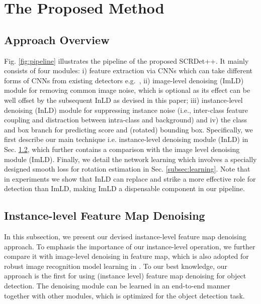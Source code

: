 \documentclass[10pt,journal,compsoc]{IEEEtran}
\begin{document}
\section{The Proposed Method}\label{sec:method}
\subsection{Approach Overview}
Fig. \ref{fig:pipeline} illustrates the pipeline of the proposed SCRDet++. It mainly consists of four modules: i) feature extraction via CNNs which can take different forms of CNNs from existing detectors e.g.~\cite{girshick2014rich,liu2016ssd}, ii) image-level denoising (ImLD) module for removing common image noise, which is optional as its effect can be well offset by the subsequent InLD as devised in this paper; iii) instance-level denoising (InLD) module for suppressing instance noise (i.e., inter-class feature coupling and distraction between intra-class and background) and iv) the class and box branch for predicting score and (rotated) bounding box. Specifically, we first describe our main technique i.e. instance-level denoising module (InLD) in Sec. \ref{subsec:InLD}, which further contains a comparison with the image level denoising module (ImLD). Finally, we detail the network learning which involves a specially designed smooth loss for rotation estimation in Sec. \ref{subsec:learning}. Note that in experiments we show that InLD can replace and strike a more effective role for detection than ImLD, making ImLD a dispensable component in our pipeline.


\subsection{Instance-level Feature Map Denoising}\label{subsec:InLD}
In this subsection, we present our devised instance-level feature map denoising approach. To emphasis the importance of our instance-level operation, we further compare it with image-level denoising in feature map, which is also adopted for robust image recognition model learning in \cite{xie2019feature}. To our best knowledge, our approach is the first for using (instance level) feature map denoising for object detection. The denoising module can be learned in an end-to-end manner together with other modules, which is optimized for the object detection task.
\end{document}
